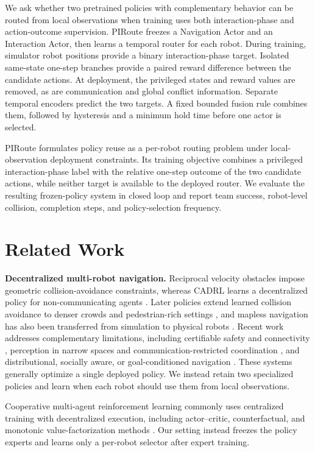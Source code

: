 \documentclass[letterpaper,10pt,conference]{ieeeconf}
\newcommand{\method}{PIRoute}
\begin{document}
We ask whether two pretrained policies with complementary behavior can be routed from local observations when training uses both interaction-phase and action-outcome supervision. \method{} freezes a Navigation Actor and an Interaction Actor, then learns a temporal router for each robot. During training, simulator robot positions provide a binary interaction-phase target. Isolated same-state one-step branches provide a paired reward difference between the candidate actions. At deployment, the privileged states and reward values are removed, as are communication and global conflict information. Separate temporal encoders predict the two targets. A fixed bounded fusion rule combines them, followed by hysteresis and a minimum hold time before one actor is selected.

\method{} formulates policy reuse as a per-robot routing problem under local-observation deployment constraints. Its training objective combines a privileged interaction-phase label with the relative one-step outcome of the two candidate actions, while neither target is available to the deployed router. We evaluate the resulting frozen-policy system in closed loop and report team success, robot-level collision, completion steps, and policy-selection frequency.

\section{Related Work}
\textbf{Decentralized multi-robot navigation.} Reciprocal velocity obstacles impose geometric collision-avoidance constraints, whereas CADRL learns a decentralized policy for non-communicating agents \cite{vanDenBerg2008,chen2017cadrl}. Later policies extend learned collision avoidance to denser crowds and pedestrian-rich settings \cite{long2018decentralized,everett2021collision}, and mapless navigation has also been transferred from simulation to physical robots \cite{tai2017virtual}. Recent work addresses complementary limitations, including certifiable safety and connectivity \cite{Cui_2022,Li_2022}, perception in narrow spaces and communication-restricted coordination \cite{Park_2023,Bramblett_2023}, and distributional, socially aware, or goal-conditioned navigation \cite{Lin_2024,Wang_2024,Feng_2025}. These systems generally optimize a single deployed policy. We instead retain two specialized policies and learn when each robot should use them from local observations.

Cooperative multi-agent reinforcement learning commonly uses centralized training with decentralized execution, including actor--critic, counterfactual, and monotonic value-factorization methods \cite{lowe2017maddpg,foerster2018coma,rashid2018qmix,gronauer2021marl}. Our setting instead freezes the policy experts and learns only a per-robot selector after expert training.
\end{document}
